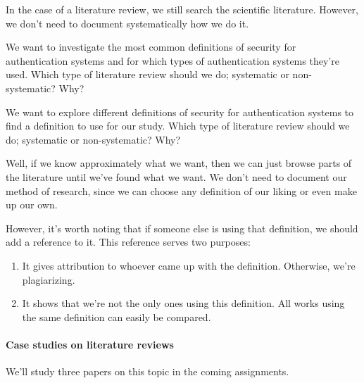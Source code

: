 In the case of a literature review, we still search the scientific literature.
However, we don't need to document systematically how we do it.

\begin{frame}
  \begin{exercise}
    We want to investigate the most common definitions of security for 
    authentication systems and for which types of authentication systems 
    they're used.
    Which type of literature review should we do; systematic or non-systematic?
    Why?
  \end{exercise}


  \begin{exercise}
    We want to explore different definitions of security for authentication 
    systems to find a definition to use for our study.
    Which type of literature review should we do; systematic or non-systematic?
    Why?
  \end{exercise}
\end{frame}

Well, if we know approximately what we want, then we can just browse parts of 
the literature until we've found what we want.
We don't need to document our method of research, since we can choose any 
definition of our liking or even make up our own.

However, it's worth noting that if someone else is using that definition, we 
should add a reference to it.
This reference serves two purposes:
\begin{enumerate}
  \item It gives attribution to whoever came up with the definition.
    Otherwise, we're plagiarizing.
  \item It shows that we're not the only ones using this definition.
    All works using the same definition can easily be compared.
\end{enumerate}

\paragraph{Case studies on literature reviews}

We'll study three papers on this topic in the coming assignments.

